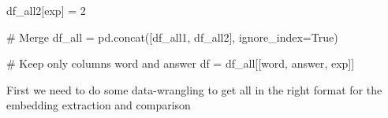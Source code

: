 \documentclass[
  letterpaper,
  DIV=11,
  numbers=noendperiod]{scrreprt}
\newenvironment{Shaded}{\begin{snugshade}}{\end{snugshade}}
\newcommand{\CommentTok}[1]{\textcolor[rgb]{0.37,0.37,0.37}{#1}}
\newcommand{\DecValTok}[1]{\textcolor[rgb]{0.68,0.00,0.00}{#1}}
\newcommand{\NormalTok}[1]{\textcolor[rgb]{0.00,0.23,0.31}{#1}}
\newcommand{\OperatorTok}[1]{\textcolor[rgb]{0.37,0.37,0.37}{#1}}
\newcommand{\StringTok}[1]{\textcolor[rgb]{0.13,0.47,0.30}{#1}}
\newcommand{\VariableTok}[1]{\textcolor[rgb]{0.07,0.07,0.07}{#1}}
\begin{document}
\begin{Shaded}
\begin{Highlighting}[]
\NormalTok{df\_all2[}\StringTok{\textquotesingle{}exp\textquotesingle{}}\NormalTok{] }\OperatorTok{=} \DecValTok{2}

\CommentTok{\# Merge}
\NormalTok{df\_all }\OperatorTok{=}\NormalTok{ pd.concat([df\_all1, df\_all2], ignore\_index}\OperatorTok{=}\VariableTok{True}\NormalTok{)}

\CommentTok{\# Keep only columns word and answer}
\NormalTok{df }\OperatorTok{=}\NormalTok{ df\_all[[}\StringTok{\textquotesingle{}word\textquotesingle{}}\NormalTok{, }\StringTok{\textquotesingle{}answer\textquotesingle{}}\NormalTok{, }\StringTok{\textquotesingle{}exp\textquotesingle{}}\NormalTok{]]}
\end{Highlighting}
\end{Shaded}

First we need to do some data-wrangling to get all in the right format
for the embedding extraction and comparison
\end{document}
